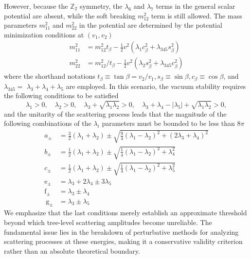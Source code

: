 However, because the $\mathbb Z_2$ symmetry, the $\lambda_6$ and $\lambda_7$ terms in the general scalar potential are absent, while the soft breaking $m_{12}^2$ term is still allowed. The mass parameters $m_{11}^2$ and $m_{22}^2$ in the potential are determined by the potential minimization conditions at $\left(v_1, v_2\right)$
\begin{align}
m_{11}^2&=m_{12}^2 t_\beta-\frac{1}{2} v^2\left(\lambda_1 c_\beta^2+\lambda_{345} s_\beta^2\right) \\
m_{22}^2&=m_{12}^2 / t_\beta-\frac{1}{2} v^2\left(\lambda_2 s_\beta^2+\lambda_{345} c_\beta^2\right)
\end{align}
where the shorthand notations $t_\beta \equiv \tan \beta=v_2 / v_1, s_\beta \equiv \sin \beta, c_\beta \equiv \cos \beta$, and $\lambda_{345}=$ $\lambda_3+\lambda_4+\lambda_5$ are employed. In this scenario, the vacuum stability requires the following conditions to be satisfied
\begin{equation}
    \lambda_1>0, \quad \lambda_2>0, \quad \lambda_3+\sqrt{\lambda_1 \lambda_2}>0, \quad \lambda_3+\lambda_4-\left|\lambda_5\right|+\sqrt{\lambda_1 \lambda_2}>0,
\end{equation}
and the unitarity of the scattering process leads that the magnitude of the following combinations of the $\lambda_i$ parameters must be bounded to be less than $8\pi$
\begin{align}
a_{ \pm} & =\frac{3}{2}\left(\lambda_1+\lambda_2\right) \pm \sqrt{\frac{9}{4}\left(\lambda_1-\lambda_2\right)^2+\left(2 \lambda_3+\lambda_4\right)^2} \\
b_{ \pm} & =\frac{1}{2}\left(\lambda_1+\lambda_2\right) \pm \sqrt{\frac{1}{4}\left(\lambda_1-\lambda_2\right)^2+\lambda_4^2} \\
c_{ \pm} & =\frac{1}{2}\left(\lambda_1+\lambda_2\right) \pm \sqrt{\frac{1}{4}\left(\lambda_1-\lambda_2\right)^2+\lambda_5^2} \\
\mathrm{e}_{ \pm} & =\lambda_3+2 \lambda_4 \pm 3 \lambda_5 \\
\mathrm{f}_{ \pm} & =\lambda_3 \pm \lambda_4 \\
\mathrm{~g}_{ \pm} & =\lambda_3 \pm \lambda_5
\end{align}
We emphasize that the last conditions merely establish an approximate threshold beyond which tree-level scattering amplitudes become unreliable. The fundamental issue lies in the breakdown of perturbative methods for analyzing scattering processes at these energies, making it a conservative validity criterion rather than an absolute theoretical boundary.

